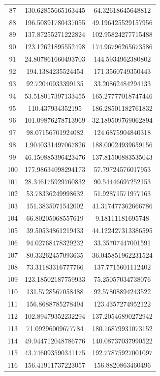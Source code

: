 \documentclass[a4paper,12pt,twoside,openany]{report}
\begin{document}
\begin{longtable}{*{3}{c}}
87	& 130.62855665163445	& 64.32618645648812	\\
88	& 196.50891780437055	& 49.196425529157956	\\
89	& 137.87255271222824	& 102.95824277715488	\\
90	& 123.12621895552498	& 174.96796265673586	\\
91	& 24.807861660493703	& 144.5934962380802	\\
92	& 194.1384235524454	& 171.3560749350443	\\
93	& 92.72040033399135	& 33.20862484294133	\\
94	& 53.518017397133455	& 165.27777018747446	\\
95	& 110.437934352195	& 186.28501182761832	\\
96	& 101.09876278713969	& 32.189509769062894	\\
97	& 98.07156701924082	& 124.6875904840318	\\
98	& 1.9040331497067826	& 188.00024939659156	\\
99	& 46.150885396423476	& 137.81500883535043	\\
100	& 177.98634098294173	& 57.79724576017953	\\
101	& 28.346175929760832	& 90.54446697252153	\\
102	& 53.78336249998632	& 51.92871571977163	\\
103	& 151.3835071542002	& 41.317477362666786	\\
104	& 66.80205068557619	& 9.18111181695748	\\
105	& 39.50534861219433	& 44.122427313386595	\\
106	& 94.02768478329232	& 33.35707447001591	\\
107	& 80.33262457093635	& 36.045851962231524	\\
108	& 73.31183316777766	& 137.7715601112402	\\
109	& 123.18502187759933	& 75.25057034738076	\\
110	& 131.5728567058488	& 92.57808894243522	\\
111	& 156.8688785278494	& 123.4357274952122	\\
112	& 102.89479352232294	& 137.20546890272942	\\
113	& 71.09296009677784	& 180.16879931073152	\\
114	& 49.944712048786776	& 140.08737037990522	\\
115	& 43.746093590341175	& 192.77875927001097	\\
116	& 156.41911737223057	& 156.8820863460496	\\

\end{longtable}
\end{document}
